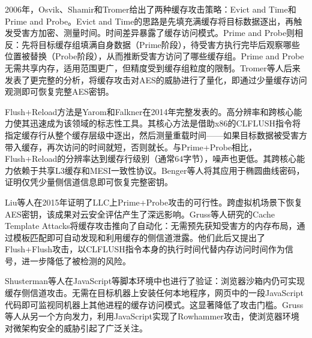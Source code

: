 2006年，Osvik、Shamir和Tromer给出了两种缓存攻击策略：Evict and Time和Prime and Probe。Evict and Time的思路是先填充满缓存将目标数据逐出，再触发受害方加密、测量时间。时间差异暴露了缓存访问模式。Prime and Probe则相反：先将目标缓存组填满自身数据（Prime阶段），待受害方执行完毕后观察哪些位置被替换（Probe阶段），从而推断受害方访问了哪些缓存组。Prime and Probe无需共享内存，适用范围更广，但精度受到缓存组粒度的限制。Tromer等人后来发表了更完整的分析\cite{Tromer2010}，将缓存攻击对AES的威胁进行了量化，即通过少量缓存访问观测即可恢复完整AES密钥。

Flush+Reload方法是Yarom和Falkner在2014年完整发表的\cite{Yarom2014}。高分辨率和跨核心能力使其迅速成为该领域的标志性工具。其核心方法是借助x86的CLFLUSH指令将指定缓存行从整个缓存层级中逐出，然后测量重载时间——如果目标数据被受害方带入缓存，再次访问的时间就短，否则就长。与Prime+Probe相比，Flush+Reload的分辨率达到缓存行级别（通常64字节），噪声也更低。其跨核心能力依赖于共享L3缓存和MESI一致性协议。Benger等人将其应用于椭圆曲线密码\cite{Benger2014}，证明仅凭少量侧信道信息即可恢复完整密钥。

Liu等人在2015年证明了LLC上Prime+Probe攻击的可行性\cite{Liu2015}。跨虚拟机场景下恢复AES密钥，该成果对云安全评估产生了深远影响。Gruss等人研究的Cache Template Attacks\cite{Gruss2015}将缓存攻击推向了自动化：无需预先获知受害方的内存布局，通过模板匹配即可自动发现和利用缓存的侧信道泄露。他们此后又提出了Flush+Flush攻击\cite{Gruss2017}，以CLFLUSH指令本身的执行时间代替内存访问时间作为信号，进一步降低了被检测的风险。

Shusterman等人在JavaScript等脚本环境中也进行了验证\cite{Shusterman2019}：浏览器沙箱内仍可实现缓存侧信道攻击。无需在目标机器上安装任何本地程序，网页中的一段JavaScript代码即可监视同机器上其他进程的缓存访问模式。这显著降低了攻击门槛。Gruss等人从另一个方向发力，利用JavaScript实现了Rowhammer攻击\cite{Gruss2016}，使浏览器环境对微架构安全的威胁引起了广泛关注。

